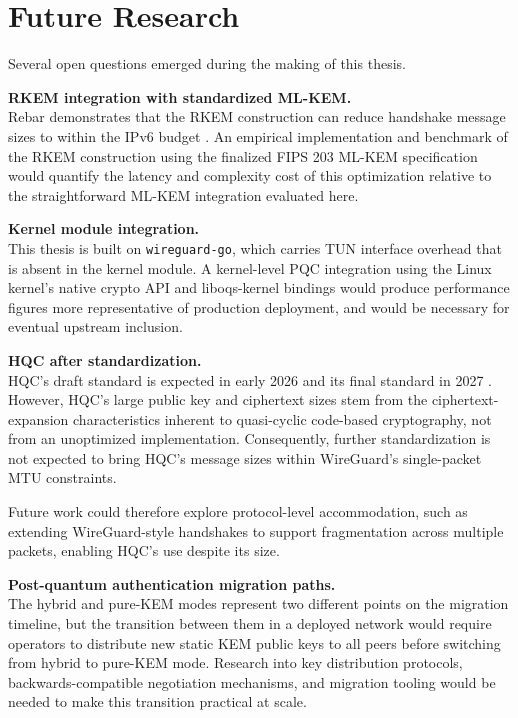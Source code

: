 \section{Future Research}
Several open questions emerged during the making of this thesis.

\textbf{RKEM integration with standardized ML-KEM.} \\ Rebar demonstrates that the RKEM construction can reduce handshake message sizes to within the IPv6 budget \cite{rebar}. An empirical implementation and benchmark of the RKEM construction using the finalized FIPS 203 ML-KEM specification would quantify the latency and complexity cost of this optimization relative to the straightforward ML-KEM integration evaluated here.

\textbf{Kernel module integration.}\\
This thesis is built on \texttt{wireguard-go}, which carries TUN interface overhead that is absent in the kernel module. A kernel-level PQC integration using the Linux kernel's native crypto API and liboqs-kernel bindings would produce performance figures more representative of production deployment, and would be necessary for eventual upstream inclusion.

\textbf{HQC after standardization.}\\
HQC's draft standard is expected in early 2026 and its final standard in 2027 \cite{Moody2025NISTIR8545}. However, HQC's large public key and ciphertext sizes stem from the ciphertext-expansion characteristics inherent to quasi-cyclic code-based cryptography, not from an unoptimized implementation. Consequently, further standardization is not expected to bring HQC's message sizes within WireGuard's single-packet MTU constraints. 

Future work could therefore explore protocol-level accommodation, such as extending WireGuard-style handshakes to support fragmentation across multiple packets, enabling HQC's use despite its size.

\textbf{Post-quantum authentication migration paths.}\\
The hybrid and pure-KEM modes represent two different points on the migration timeline, but the transition between them in a deployed network would require operators to distribute new static KEM public keys to all peers before switching from hybrid to pure-KEM mode. Research into key distribution protocols, backwards-compatible negotiation mechanisms, and migration tooling would be needed to make this transition practical at scale.